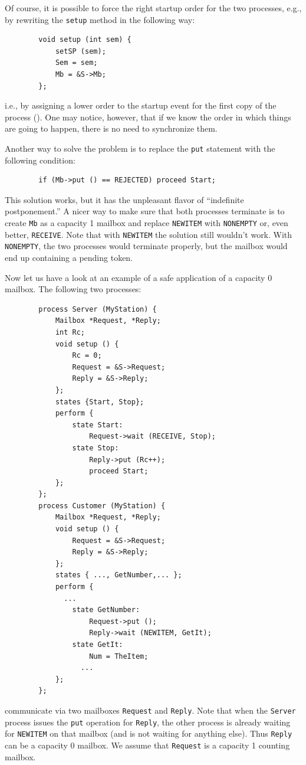 Of course, it is possible to force the right startup order for the
two processes, e.g., by rewriting the {\tt setup} method in the following
way:
\begin{verbatim}
        void setup (int sem) {
            setSP (sem);
            Sem = sem;
            Mb = &S->Mb;
        };
\end{verbatim}
i.e., by assigning a lower order to the startup event for the first
copy of the process ().
One may notice, however, that if we know the order in which things are
going to happen, there is no need to synchronize them.

Another
way to solve the problem is to replace the {\tt put} statement with the
following condition:
\begin{verbatim}
        if (Mb->put () == REJECTED) proceed Start;
\end{verbatim}
This solution works, but it has the unpleasant flavor of ``indefinite
postponement.''
A nicer way to make sure that both processes terminate
is to create {\tt Mb} as a capacity 1 mailbox and replace
{\tt NEWITEM} with {\tt NONEMPTY} or, even better, {\tt RECEIVE}.
Note that with {\tt NEWITEM} the solution still wouldn't work.
With {\tt NONEMPTY}, the two processes would terminate properly,
but the mailbox would end up containing a pending token.

Now let us have a look at an example of a safe application of
a capacity 0 mailbox.
The following two processes:
\begin{verbatim}
        process Server (MyStation) {
            Mailbox *Request, *Reply;
            int Rc;
            void setup () {
                Rc = 0;
                Request = &S->Request;
                Reply = &S->Reply;
            };
            states {Start, Stop};
            perform {
                state Start:
                    Request->wait (RECEIVE, Stop);
                state Stop:
                    Reply->put (Rc++);
                    proceed Start;
            };
        };
        process Customer (MyStation) {
            Mailbox *Request, *Reply;
            void setup () {
                Request = &S->Request;
                Reply = &S->Reply;
            };
            states { ..., GetNumber,... };
            perform {
              ...
                state GetNumber:
                    Request->put ();
                    Reply->wait (NEWITEM, GetIt);
                state GetIt:
                    Num = TheItem;
                  ...
            };
        };
\end{verbatim}
communicate via two mailboxes {\tt Request} and {\tt Reply}.
Note that when the {\tt Server} process issues the {\tt put} operation for
{\tt Reply}, the other process is already waiting for {\tt NEWITEM} on
that mailbox (and is not waiting for anything else).
Thus {\tt Reply} can be a capacity 0 mailbox.
We assume that {\tt Request} is a capacity 1 counting mailbox.

